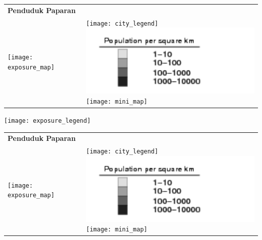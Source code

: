 \documentclass[a4paper]{article}
\begin{document}


\bigskip


\bigskip


\bigskip
\begin{tabular}{l@{}l}
  \Large \textbf{Penduduk Paparan} & \\
  \parbox[t]{0.7\textwidth}{
    \vspace{0pt}
    \texttt{[image: exposure\_map]}} &
  \parbox[t]{0.3\textwidth}{
    \vspace{0pt}
    \texttt{[image: city\_legend]} \\
    \includegraphics{population_legend}\\
    \texttt{[image: mini\_map]}
  }
\end{tabular}


\clearpage


\bigskip


\bigskip
\texttt{[image: exposure\_legend]} \\

\bigskip
\begin{tabular}{l@{}l}
  \Large \textbf{Penduduk Paparan} & \\
  \parbox[t]{0.7\textwidth}{
    \vspace{0pt}
    \texttt{[image: exposure\_map]}} &
  \parbox[t]{0.3\textwidth}{
    \vspace{0pt}
    \texttt{[image: city\_legend]} \\
    \includegraphics{population_legend}\\
    \texttt{[image: mini\_map]}
  }
\end{tabular}
\end{document}
